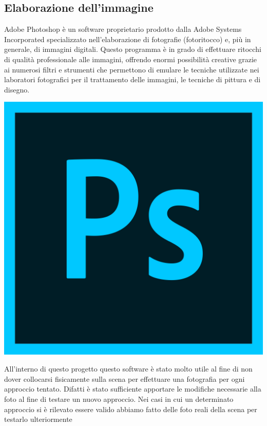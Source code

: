 \documentclass[twoside]{supsistudent}
\begin{document}
\subsection{Elaborazione dell'immagine}
\noindent
\begin{minipage}[H]{0.49\textwidth} 
  \begin{flushleft}
    Adobe Photoshop è un software proprietario prodotto dalla Adobe Systems Incorporated specializzato nell'elaborazione di fotografie (fotoritocco) e, più in generale, di immagini digitali.
    Questo programma è in grado di effettuare ritocchi di qualità professionale alle immagini, offrendo enormi possibilità creative grazie ai numerosi filtri e strumenti che permettono di 
    emulare le tecniche utilizzate nei laboratori fotografici per il trattamento delle immagini, le tecniche di pittura e di disegno.
  \end{flushleft}
  \end{minipage}
\hfill
\begin{minipage}[H]{0.49\textwidth}
  \begin{center}
    \includegraphics[scale=0.1]{images/photoshop.png}
  \end{center}
\end{minipage}

\bigskip
All'interno di questo progetto questo software è stato molto utile al fine di non dover collocarsi fisicamente sulla scena per effettuare una fotografia per ogni approccio tentato. Difatti 
è stato sufficiente apportare le modifiche necessarie alla foto al fine di testare un nuovo approccio. Nei casi in cui un determinato approccio si è rilevato essere valido abbiamo fatto delle 
foto reali della scena per testarlo ulteriormente
\end{document}
